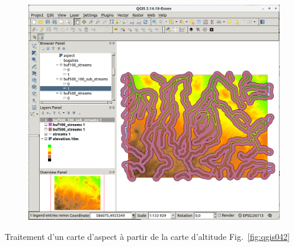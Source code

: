 \begin{figure}[htbp]
   \centering
   \includegraphics[scale=0.2]{qgis041.png}
   \caption{}
   \label{fig:qgis041}
\end{figure}

Traitement d'un carte d'aspect \`a partir de la carte d'altitude Fig.~\ref{fig:qgis042}

